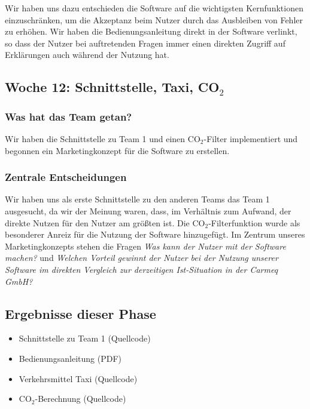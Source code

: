 \documentclass[12pt,a4paper]{article}
\begin{document}
Wir haben uns dazu entschieden die Software auf die wichtigsten Kernfunktionen einzuschr\"anken, um die Akzeptanz beim Nutzer durch das Ausbleiben von Fehler zu erh\"ohen. Wir haben die Bedienungsanleitung direkt in der Software verlinkt, so dass der Nutzer bei auftretenden Fragen immer einen direkten Zugriff auf Erkl\"arungen auch w\"ahrend der Nutzung hat.


\subsection{Woche 12: Schnittstelle, Taxi, CO$_2$}

\subsubsection{Was hat das Team getan?}

Wir haben die Schnittstelle zu Team 1 und einen CO$_2$-Filter implementiert und begonnen ein Marketingkonzept f\"ur die Software zu erstellen.

\subsubsection{Zentrale Entscheidungen}

Wir haben uns als erste Schnittstelle zu den anderen Teams das Team 1 ausgesucht, da wir der Meinung waren, dass, im Verh\"altnis zum Aufwand, der direkte Nutzen f\"ur den Nutzer am gr\"o\ss ten ist. Die CO$_2$-Filterfunktion wurde als besonderer Anreiz f\"ur die Nutzung der Software hinzugef\"ugt. Im Zentrum unseres Marketingkonzepts stehen die Fragen \textit{Was kann der Nutzer mit der Software machen?} und \textit{Welchen Vorteil gewinnt der Nutzer bei der Nutzung unserer Software im direkten Vergleich zur derzeitigen Ist-Situation in der Carmeq GmbH?}

\subsection{Ergebnisse dieser Phase}

\begin{itemize}
\item Schnittstelle zu Team 1 (Quellcode)
\item Bedienungsanleitung (PDF)
\item Verkehrsmittel Taxi (Quellcode)
\item CO$_2$-Berechnung (Quellcode)
\end{itemize}
\end{document}
